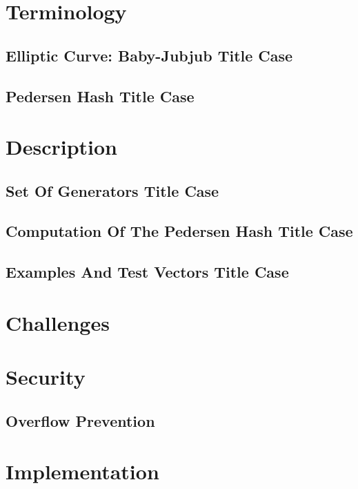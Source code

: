 \documentclass[11pt]{article}
\begin{document}
	\section{Terminology}	
		\subsection{Elliptic Curve: Baby-Jubjub  {\color{purple} Title Case}}
			
		\subsection{Pedersen Hash {\color{purple} Title Case}}
			
	
	\section{Description}
	
	\subsection{Set Of Generators {\color{purple} Title Case}}
		
		\subsection{Computation Of The Pedersen Hash {\color{purple} Title Case}}
		
		\label{sec-computation}
		\subsection{Examples And Test Vectors {\color{purple} Title Case}}
		
	\section{Challenges}
	

	\section{Security}
		\subsection{\color{purple} Overflow Prevention}
			

			
	\section{Implementation}
\end{document}
